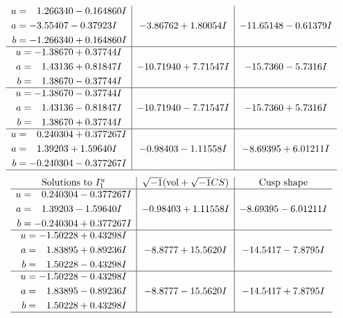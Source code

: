 \documentclass[1p]{elsarticle_modified}
\theoremstyle{definition}
\newcommand{\I}{\sqrt{-1}}
\begin{document}
$$\begin{array}{c|c|c}
\begin{aligned}
u &= \phantom{-}1.266340 - 0.164860 I \\
a &= -3.55407 - 0.37923 I \\
b &= -1.266340 + 0.164860 I\end{aligned}
 & -3.86762 + 1.80054 I & -11.65148 - 0.61379 I \\ \hline\begin{aligned}
u &= -1.38670 + 0.37744 I \\
a &= \phantom{-}1.43136 + 0.81847 I \\
b &= \phantom{-}1.38670 - 0.37744 I\end{aligned}
 & -10.71940 + 7.71547 I & -15.7360 - 5.7316 I \\ \hline\begin{aligned}
u &= -1.38670 - 0.37744 I \\
a &= \phantom{-}1.43136 - 0.81847 I \\
b &= \phantom{-}1.38670 + 0.37744 I\end{aligned}
 & -10.71940 - 7.71547 I & -15.7360 + 5.7316 I \\ \hline\begin{aligned}
u &= \phantom{-}0.240304 + 0.377267 I \\
a &= \phantom{-}1.39203 + 1.59640 I \\
b &= -0.240304 - 0.377267 I\end{aligned}
 & -0.98403 - 1.11558 I & -8.69395 + 6.01211 I\\
 \hline 
 \end{array}$$\newpage$$\begin{array}{c|c|c}  
\text{Solutions to }I^u_{1}& \I (\text{vol} + \sqrt{-1}CS) & \text{Cusp shape}\\
 \hline 
\begin{aligned}
u &= \phantom{-}0.240304 - 0.377267 I \\
a &= \phantom{-}1.39203 - 1.59640 I \\
b &= -0.240304 + 0.377267 I\end{aligned}
 & -0.98403 + 1.11558 I & -8.69395 - 6.01211 I \\ \hline\begin{aligned}
u &= -1.50228 + 0.43298 I \\
a &= \phantom{-}1.83895 + 0.89236 I \\
b &= \phantom{-}1.50228 - 0.43298 I\end{aligned}
 & -8.8777 + 15.5620 I & -14.5417 - 7.8795 I \\ \hline\begin{aligned}
u &= -1.50228 - 0.43298 I \\
a &= \phantom{-}1.83895 - 0.89236 I \\
b &= \phantom{-}1.50228 + 0.43298 I\end{aligned}
 & -8.8777 - 15.5620 I & -14.5417 + 7.8795 I\\
 \hline 
 \end{array}$$\newpage\newpage\renewcommand{\arraystretch}{1}
\end{document}
